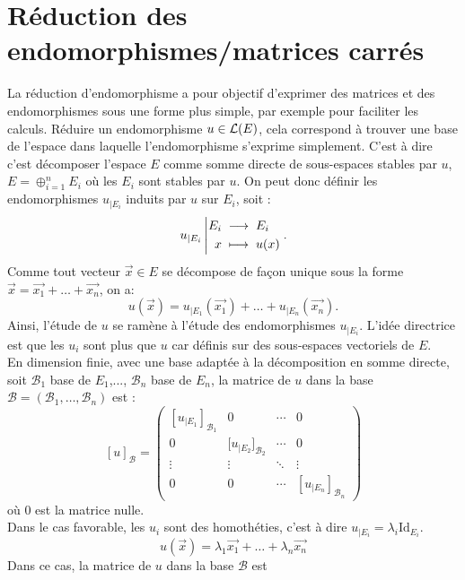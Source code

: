 \documentclass[a4paper]{book}
\begin{document}
\chapter*{Réduction des endomorphismes/matrices carrés}
La réduction d'endomorphisme a pour objectif d'exprimer des matrices et des endomorphismes sous une forme plus simple, par exemple pour faciliter les calculs. 
Réduire un endomorphisme $u\in\mathcal{L}(E)$, cela correspond à trouver une base de l'espace dans laquelle l'endomorphisme s'exprime simplement. C'est à dire c'est décomposer l'espace $E$ comme somme directe de sous-espaces stables par $u$,
$E = \oplus     _{i=1}^n E_i$ où les $E_i$ sont stables par $u$. On peut donc définir  les endomorphismes $u_{|E_i}$ induits par $u$ sur $E_i$, soit :
 $${u_{|E_i}}\left|\begin{aligned}{E_i }&\;\longrightarrow\;{E_i}\\{x}&\;\longmapsto\;{u(x)}\end{aligned}\right..$$
Comme tout vecteur $\vec{x}\in E$ se décompose de façon unique sous la forme
$\vec{x} =  \vec{x_1} + \dots + \vec{x_n}$, on a:
$$ u(\vec{x}) =  u_{|E_1}(\vec{x_1}) + \dots + u_{|E_n}(\vec{x_n}).$$
Ainsi, l'étude de $u$ se ramène à l'étude des endomorphismes $u_{|E_i}$. L'idée directrice est que les $u_i$ sont plus  que $u$ car définis sur des sous-espaces vectoriels de $E$.\\
En dimension finie, avec une base adaptée à la décomposition en somme directe, soit $\mathcal{B}_1$ base de $E_1$,..., $\mathcal{B}_n$ base de $E_n$, la matrice de $u$ dans la base $\mathcal{B}=(\mathcal{B}_1,\dots,\mathcal{B}_n)$ est :  
$$ [u]_\mathcal{B} =\begin{pmatrix}[u_{|E_1}]_{\mathcal{B}_1}&\mathrm {0}&\cdots &\mathrm {0}\\\mathrm {0}&\mathrm [u_{|E_2}]_{\mathcal{B}_2}&\cdots &\mathrm {0}\\\vdots &\vdots &\ddots &\vdots \\\mathrm {0}&\mathrm {0}&\cdots &[u_{|E_n}]_{\mathcal{B}_n}\end{pmatrix}$$
où $\mathrm {0}$ est la matrice nulle.\\
Dans le cas favorable, les $u_i$ sont des homothéties, c'est à dire $u_{|E_i} =\lambda    _i \mathrm{Id}_{E_i}$. 
$$u(\vec{x})=\lambda_1\vec{x_1}+\dots+\lambda_n\vec{x_n}$$
Dans ce cas, la matrice de $u$ dans la base $\mathcal{B}$ est
\end{document}

